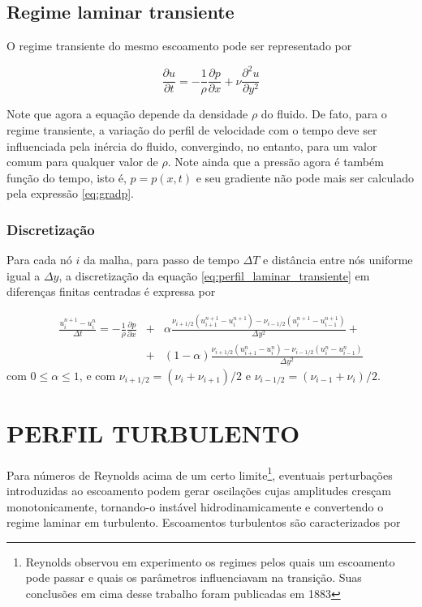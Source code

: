 \documentclass[a4paper,portuguese,10pt]{article}
\renewcommand{\D}{\partial}
\begin{document}
\subsection{Regime laminar transiente}

O regime transiente do mesmo escoamento pode ser representado por

\begin{equation}
    \frac{\D u}{\D t}=-\frac{1}{\rho}\frac{\D p}{\D x}+\nu\frac{\D^2u}{\D y^2}
    \label{eq:perfil_laminar_transiente}
\end{equation}

Note que agora a equação depende da densidade $\rho$ do fluido. De fato, para o regime transiente, a variação do perfil de velocidade com o tempo deve ser influenciada pela inércia do fluido, convergindo, no entanto, para um valor comum para qualquer valor de $\rho$. Note ainda que a pressão agora é também função do tempo, isto é, $p = p(x,t)$ e seu gradiente não pode mais ser calculado pela expressão \ref{eq:gradp}.

\subsubsection{Discretização}

Para cada nó $i$ da malha, para passo de tempo $\Delta T$ e distância entre nós uniforme igual a $\Delta y$, a discretização da equação \ref{eq:perfil_laminar_transiente} em diferenças finitas centradas é expressa por

\begin{eqnarray}
  \frac{u_i^{n+1}-u_i^n}{\Delta t} = -\frac{1}{\rho}\frac{\D p}{\D x} &+& \alpha\frac{\nu_{i+1/2}(u_{i+1}^{n+1}-u_{i}^{n+1})-\nu_{i-1/2}(u_{i}^{n+1}-u_{i-1}^{n+1})}{\Delta y^2}+\nonumber\\ &+& (1-\alpha)\frac{\nu_{i+1/2}(u_{i+1}^n-u_{i}^n)-\nu_{i-1/2}(u_{i}^n-u_{i-1}^n)}{\Delta y^2}
  \label{eq:perfil_laminar_discr}
\end{eqnarray}
com $0\leq\alpha\leq 1$, e com $\nu_{i+1/2} = (\nu_{i}+\nu_{i+1})/2$ e $\nu_{i-1/2} = (\nu_{i-1}+\nu_{i})/2$.

\section{PERFIL TURBULENTO}

Para números de Reynolds acima de um certo limite\footnote{Reynolds observou em experimento os regimes pelos quais um escoamento pode passar e quais os parâmetros influenciavam na transição. Suas conclusões em cima desse trabalho foram publicadas em 1883\cite{REYNOLDS83,DAVIDSON11}}, eventuais perturbações introduzidas ao escoamento podem gerar oscilações cujas amplitudes cresçam monotonicamente, tornando-o instável hidrodinamicamente e convertendo o regime laminar em turbulento. Escoamentos turbulentos são caracterizados por
\end{document}
